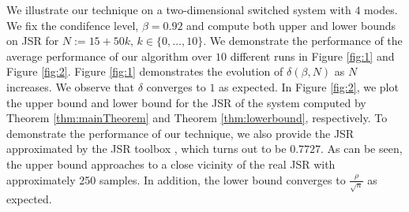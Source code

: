 We illustrate our technique on a two-dimensional switched system with $4$ modes. We fix the condifence level, \mbox{$\beta = 0.92$} and compute both upper and lower bounds on JSR for $N:=15+50k,\, k \in\{0, \ldots, 10\}.$ We demonstrate the performance of the average performance of our algorithm over $10$ different runs in Figure \ref{fig:1} and Figure \ref{fig:2}. Figure \ref{fig:1} demonstrates the evolution of $\delta(\beta, N)$ as $N$ increases. We observe that $\delta$ converges to $1$ as expected. In Figure \ref{fig:2}, we plot the upper bound and lower bound for the JSR of the system computed by Theorem \ref{thm:mainTheorem} and Theorem \ref{thm:lowerbound}, respectively. To demonstrate the performance of our technique, we also provide the JSR approximated by the JSR toolbox \cite{jsrtoolbox}, which turns out to be $0.7727$. As can be seen, the upper bound approaches to a close vicinity of the real JSR with approximately 250 samples. In addition, the lower bound converges to $\frac{\rho}{\sqrt{n}}$ as expected.

